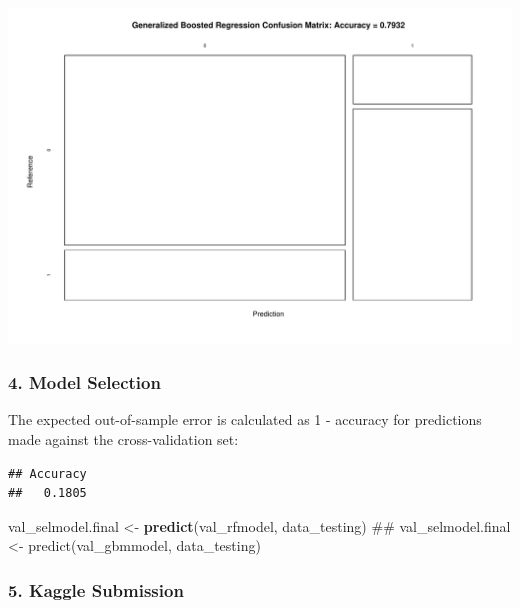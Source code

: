 \documentclass[]{article}
\newenvironment{Shaded}{\begin{snugshade}}{\end{snugshade}}
\newcommand{\KeywordTok}[1]{\textcolor[rgb]{0.13,0.29,0.53}{\textbf{{#1}}}}
\newcommand{\DecValTok}[1]{\textcolor[rgb]{0.00,0.00,0.81}{{#1}}}
\newcommand{\StringTok}[1]{\textcolor[rgb]{0.31,0.60,0.02}{{#1}}}
\newcommand{\NormalTok}[1]{{#1}}
\begin{document}
\includegraphics{figure/unnamed-chunk-18-1.pdf}

\subsubsection{4. Model Selection}\label{model-selection}

The expected out-of-sample error is calculated as 1 - accuracy for
predictions made against the cross-validation set:

\begin{Shaded}
\end{Shaded}

\begin{verbatim}
## Accuracy 
##   0.1805
\end{verbatim}

\begin{Shaded}
\begin{Highlighting}[]
\NormalTok{val_selmodel.final <-}\StringTok{ }\KeywordTok{predict}\NormalTok{(val_rfmodel, data_testing)}
\NormalTok{## val_selmodel.final <- predict(val_gbmmodel, data_testing)}
\end{Highlighting}
\end{Shaded}

\subsubsection{5. Kaggle Submission}\label{kaggle-submission}
\end{document}
